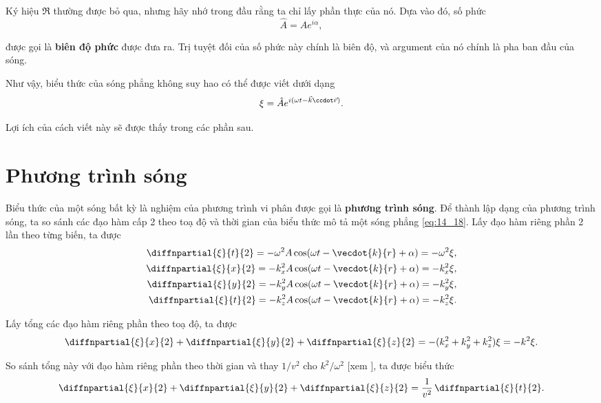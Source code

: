 \noindent
Ký hiệu $\Re$ thường được bỏ qua, nhưng hãy nhớ trong đầu rằng ta chỉ lấy phần thực của nó. Dựa vào đó, số phức
\begin{equation}\label{eq:14_21}
    \hat{A} = A e^{i\alpha},
\end{equation}

\noindent
được gọi là \textbf{biên độ phức} được đưa ra. Trị tuyệt đối của số phức này chính là biên độ, và argument của nó chính là pha ban đầu của sóng.

Như vậy, biểu thức của sóng phẳng không suy hao có thể được viết dưới dạng
\begin{equation}\label{eq:14_22}
    \xi = \hat{A} e^{i(\omega t - \vec{k}\ccdot\vec{r})}.
\end{equation}

\noindent
Lợi ích của cách viết này sẽ được thấy trong các phần sau.

\section{Phương trình sóng}\label{sec:14_4}

Biểu thức của một sóng bất kỳ là nghiệm của phương trình vi phân được gọi là \textbf{phương trình sóng}. Để thành lập dạng của phương trình sóng, ta so sánh các đạo hàm cấp 2 theo toạ độ và thời gian của biểu thức mô tả một sóng phẳng \eqref{eq:14_18}. Lấy đạo hàm riêng phần 2 lần theo từng biến, ta được
\begin{align*}
    \diffnpartial{\xi}{t}{2} = -\omega^2 A \cos(\omega t - \vecdot{k}{r} + \alpha) = -\omega^2 \xi,\\
    \diffnpartial{\xi}{x}{2} = -k_x^2 A \cos(\omega t - \vecdot{k}{r} + \alpha) = -k_x^2 \xi,\\
    \diffnpartial{\xi}{y}{2} = -k_y^2 A \cos(\omega t - \vecdot{k}{r} + \alpha) = -k_y^2 \xi,\\
    \diffnpartial{\xi}{t}{2} = -k_z^2 A \cos(\omega t - \vecdot{k}{r} + \alpha) = -k_z^2 \xi.
\end{align*}

\noindent
Lấy tổng các đạo hàm riêng phần theo toạ độ, ta được
\begin{equation}\label{eq:14_23}
    \diffnpartial{\xi}{x}{2} + \diffnpartial{\xi}{y}{2} + \diffnpartial{\xi}{z}{2} = - (k_x^2 + k_y^2 + k_z^2) \xi = -k^2 \xi.
\end{equation}

\noindent
So sánh tổng này với đạo hàm riêng phần theo thời gian và thay $1/v^2$ cho $k^2/\omega^2$ [xem ], ta được biểu thức
\begin{equation}\label{eq:14_24}
    \diffnpartial{\xi}{x}{2} + \diffnpartial{\xi}{y}{2} + \diffnpartial{\xi}{z}{2} = \frac{1}{v^2}\, \diffnpartial{\xi}{t}{2}.
\end{equation}

